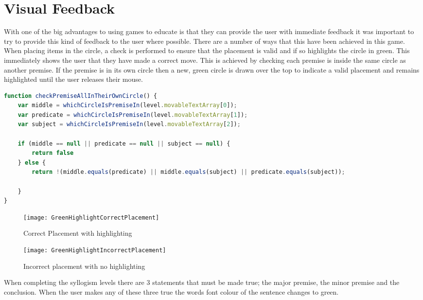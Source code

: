 \documentclass[12pt,a4paper]{report}
\begin{document}
	\section{Visual Feedback}
With one of the big advantages to using games to educate is that they can provide the user with immediate feedback it was important to try to provide this kind of feedback to the user where possible. There are a number of ways that this have been achieved in this game. When placing items in the circle, a check is performed to ensure that the placement is valid and if so highlights the circle in green. This immediately shows the user that they have made a correct move.  This is achieved by checking each premise is inside the same circle as another premise. If the premise is in its own circle then a new, green circle is drawn over the top to indicate a valid placement and remains highlighted until the user releases their mouse.

\begin{lstlisting}[language=JavaScript]
function checkPremiseAllInTheirOwnCircle() {
    var middle = whichCircleIsPremiseIn(level.movableTextArray[0]);
    var predicate = whichCircleIsPremiseIn(level.movableTextArray[1]);
    var subject = whichCircleIsPremiseIn(level.movableTextArray[2]);

    if (middle == null || predicate == null || subject == null) {
        return false
    } else {
        return !(middle.equals(predicate) || middle.equals(subject) || predicate.equals(subject));

    }
}
\end{lstlisting}

\begin{figure}[!h]
  \centering
  \begin{minipage}[b]{0.4\textwidth}
    \texttt{[image: GreenHighlightCorrectPlacement]}
    \caption{Correct Placement with highlighting}
  \end{minipage}
  \hfill
  \begin{minipage}[b]{0.4\textwidth}
    \texttt{[image: GreenHighlightIncorrectPlacement]}
    \caption{Incorrect placement with no highlighting}
  \end{minipage}
\end{figure}
\FloatBarrier

When completing the syllogism levels there are 3 statements that must be made true; the major premise, the minor premise and the conclusion. When the user makes any of these three true the words font colour of the sentence changes to green.
\end{document}
